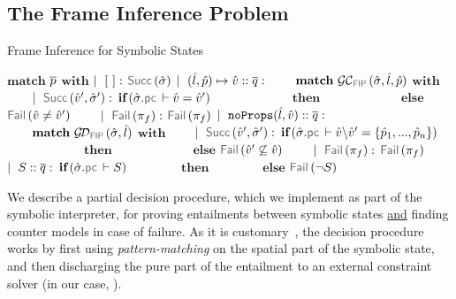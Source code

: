 \subsection{The Frame Inference Problem}\label{subsec:fip}

{\footnotesize \begin{algorithm}[t!]
\caption{Frame Inference for Symbolic States}\label{fip:symb:states}
\begin{algorithmic}[1]
    \State $\textbf{match}$ $\overline{p}$ $\textbf{with}$
    \State $\mid~[ \ ]:$ \Return $\success{\sstate}$
    \State $\mid~(\hat{l}, \hat{p}) \mapsto \hat{v} :: \overline{q} :$ 
    \State $\qquad \textbf{match} \ \GetCellV{\sstate, \sloc, \sexprp}$ $\textbf{with}$
    \State $\qquad \mid~\success{\sexprv', \sstate'}:$ $\textbf{if} \,(\sstate.\pcsel \vdash \sexprv = \sexprv')$
     \State $\qquad \qquad \qquad ~  \textbf{then}$ \Return  {}
     \State $\qquad \qquad \qquad ~  \textbf{else}$ \Return $\fail{\sexprv \neq \sexprv'}$
      \State $\qquad \mid~\fail{\pc_f}:$ \Return $\fail{\pc_f}$
     \State $\mid~\texttt{noProps}(\hat{l}, \hat{v}) :: \overline{q} :$  
       \State $\qquad \textbf{match} \ \GetDomainV{\sstate, \sloc}$ $\textbf{with}$
       \State $\qquad \mid~\success{\sexprv', \sstate'}:$ $\textbf{if} \,(\sstate.\pcsel \vdash \sexprv \backslash \sexprv' = \{ \sexprp_1, ..., \sexprp_n \})$
        \State $\qquad \qquad \qquad ~  \textbf{then}$ \Return {}
       \State $\qquad \qquad \qquad ~  \textbf{else}$ \Return $\fail{\sexprv' \not\subseteq \sexprv }$
       \State $\qquad \mid~\fail{\pc_f}:$ \Return $\fail{\pc_f}$
     \State $\mid~S :: \overline{q} :$  $ \textbf{if} \,(\sstate.\pcsel \vdash \sass)$
       \State $\qquad \qquad \textbf{then}$ \Return  {}
      \State $\qquad \qquad \textbf{else}$  \Return $\fail{\neg \sass}$
\EndFunction
\end{algorithmic}
\end{algorithm}}

We describe a partial decision procedure, which we  
implement as part of the \jsil symbolic interpreter, for proving entailments 
between symbolic states \underline{and} finding counter 
models in case of failure.  
As it is customary~\cite{javert,jacobs2011verifast,sepwithsmt}, the decision procedure works by first using \emph{pattern-matching} 
on the spatial part of the symbolic state, and then discharging the pure part of the 
entailment to an external constraint solver (in our case, \rosette). 

